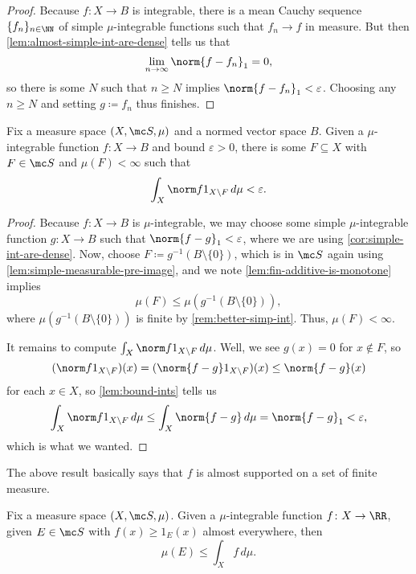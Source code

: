 \documentclass[../notes.tex]{subfiles}
\begin{document}
\begin{proof}
	Because $f\colon X\to B$ is integrable, there is a mean Cauchy sequence $\{f_n\}_{n\in\NN}$ of simple $\mu$-integrable functions such that $f_n\to f$ in measure. But then \autoref{lem:almost-simple-int-are-dense} tells us that
	\[\lim_{n\to\infty}\norm{f-f_n}_1=0,\]
	so there is some $N$ such that $n\ge N$ implies $\norm{f-f_n}_1<\varepsilon$. Choosing any $n\ge N$ and setting $g\coloneqq f_n$ thus finishes.
\end{proof}
\begin{lemma} \label{lem:almost-support-l1}
	Fix a measure space $(X,\mc S,\mu)$ and a normed vector space $B$. Given a $\mu$-integrable function $f\colon X\to B$ and bound $\varepsilon>0$, there is some $F\subseteq X$ with $F\in\mc S$ and $\mu(F)<\infty$ such that
	\[\int_X\norm f1_{X\setminus F}\,d\mu<\varepsilon.\]
\end{lemma}
\begin{proof}
	Because $f\colon X\to B$ is $\mu$-integrable, we may choose some simple $\mu$-integrable function $g\colon X\to B$ such that $\norm{f-g}_1<\varepsilon$, where we are using \autoref{cor:simple-int-are-dense}. Now, choose $F\coloneqq g^{-1}(B\setminus\{0\})$, which is in $\mc S$ again using \autoref{lem:simple-measurable-pre-image}, and we note \autoref{lem:fin-additive-is-monotone} implies
	\[\mu(F)\le\mu\left(g^{-1}(B\setminus\{0\})\right),\]
	where $\mu\left(g^{-1}(B\setminus\{0\})\right)$ is finite by \autoref{rem:better-simp-int}. Thus, $\mu(F)<\infty$.
	
	It remains to compute $\int_X\norm f1_{X\setminus F}\,d\mu$. Well, we see $g(x)=0$ for $x\notin F$, so
	\[(\norm f1_{X\setminus F})(x)=(\norm{f-g}1_{X\setminus F})(x)\le\norm{f-g}(x)\]
	for each $x\in X$, so \autoref{lem:bound-ints} tells us
	\[\int_X\norm f1_{X\setminus F}\,d\mu\le\int_X\norm{f-g}\,d\mu=\norm{f-g}_1<\varepsilon,\]
	which is what we wanted.
\end{proof}
\begin{remark}
	The above result basically says that $f$ is almost supported on a set of finite measure.
\end{remark}
\begin{lemma} \label{lem:bound-meas-set}
	Fix a measure space $(X,\mc S,\mu)$. Given a $\mu$-integrable function $f\colon X\to\RR$, given $E\in\mc S$ with $f(x)\ge1_E(x)$ almost everywhere, then
	\[\mu(E)\le\int_Xf\,d\mu.\]
\end{lemma}
\end{document}
